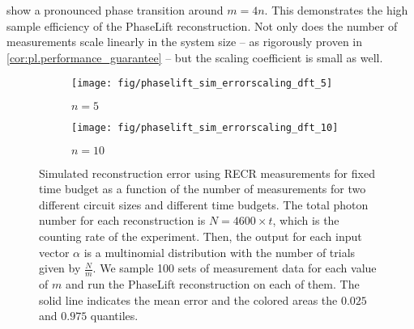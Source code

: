  show a pronounced phase transition around $m = 4n$.
This demonstrates the high sample efficiency of the PhaseLift reconstruction.
Not only does the number of measurements scale linearly in the system size -- as rigorously proven in \cref{cor:pl.performance_guarantee} -- but the scaling coefficient is small as well.\\

\begin{figure*}[t]
  \begin{subfigure}{.475\columnwidth}
    \texttt{[image: fig/phaselift\_sim\_errorscaling\_dft\_5]}
    \caption{\label{sfig:pl.simerror.five}%
      $n = 5$
    }
   \end{subfigure}
  \begin{subfigure}{.475\columnwidth}
    \texttt{[image: fig/phaselift\_sim\_errorscaling\_dft\_10]}
    \caption{\label{sfig:pl.simerror.ten}%
      $n = 10$
    }
   \end{subfigure}
  \caption{\label{fig:pl.simerror}%
    Simulated reconstruction error using RECR measurements for fixed time budget as a function of the number of measurements for two different circuit sizes and different time budgets.
    The total photon number for each reconstruction is $N = 4600 \times t$, which is the counting rate of the experiment.
    Then, the output for each input vector $\alpha$ is a multinomial distribution with the number of trials given by $\frac{N}{m}$.
    We sample 100 sets of measurement data for each value of $m$ and run the PhaseLift reconstruction on each of them.
    The solid line indicates the mean error and the colored areas the $0.025$ and $0.975$ quantiles.
  }
\end{figure*}


